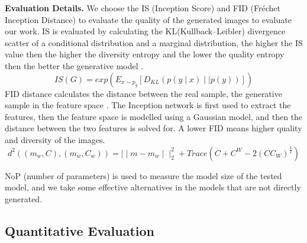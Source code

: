 \documentclass[runningheads, orivec]{llncs}
\begin{document}
\noindent \textbf{Evaluation Details.} We choose the IS (Inception Score) and FID (Fréchet Inception Distance) to evaluate the quality of the generated images to evaluate our work. IS is evaluated by calculating the KL(Kullback–Leibler) divergence scatter of a conditional distribution and a marginal distribution, the higher the IS value then the higher the diversity entropy and the lower the quality entropy then the better the generative model \cite{salimans2016improved}.
\begin{equation}
    IS(G)=exp(E_{x\sim p_{g}}[D_{KL}(p(y\mid x)\mid \mid p(y))])
\end{equation}
FID distance calculates the distance between the real sample, the generative sample in the feature space \cite{heusel2017gans}. The Inception network is first used to extract the features, then the feature space is modelled using a Gaussian model, and then the distance between the two features is solved for. A lower FID means higher quality and diversity of the images.
\begin{equation}
    d^{2}((m_{w},C),(m_{w},C_{w}))=\mid \mid m-m_{w}\mid \mid^{2}_{2}+ Trace(C+C^{W}-2(CC_{W})^{\frac{1}{2}})
\end{equation}

NoP (number of parameters) is used to measure the model size of the tested model, and we take some effective alternatives in the models that are not directly generated.
\vspace{-10pt}
\subsection{Quantitative Evaluation}
\end{document}
